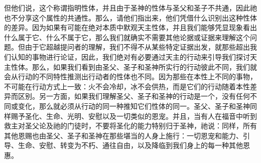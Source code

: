 但他们说，这个称谓指明性体，并且由于圣神的性体与圣父和圣子不共通，因此祂也不分享这个属性的共通性。那么，请他们指出来，他们凭借什么识别出这种性体的差异。因为如果有可能在绝对本质中默观天主性体，并且我们能够凭显现象看出什么属于它、什么不属于它，那么我们就确实不需要其他论据或证据来理解这个问题。但由于它超越提问者的理解，我们不得不从某些特定证据出发，就那些超出我们认知的事物进行论证，因此，我们绝对有必要通过天主的行动来引导我们探讨天主性体。那么，如果我们看到由圣父、圣子和圣神所实行的行动彼此不同，我们就会从行动的不同特性推测出行动者的性体也不同。因为那些在本性上不同的事物，不可能在行动方式上一致：火不会冷却，冰不会供热，而是它们的行动随着本性差异而区别。另一方面，如果我们理解圣父、圣子和圣神的行动是一个，没有任何不同或变化，那么就必须从行动的同一种推知它们性体的同一。圣父、圣子和圣神同样赐予圣化、生命、光明、安慰以及一切类似的恩宠。并且，当有人在福音中听到救主对圣父论及祂的门徒时，不要将圣化的能力特别归于圣神，祂说：同样，所有其他恩赐也由圣父、圣子和圣神在那些堪当的人身上施行：一切恩宠和能力、引导、生命、安慰、转变为不朽、通往自由，以及降临到我们身上的每一种其他恩惠。\par

